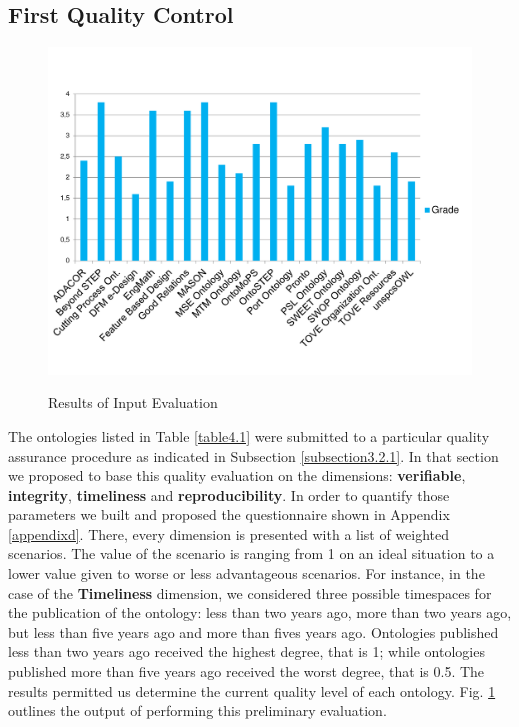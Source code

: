 \subsection{First Quality Control}\label{subsection4.2.2}

\begin{figure}
	\begin{center}
		\includegraphics[scale=0.5]{figure-chapterIV/fig4-1.pdf}\\
		\caption{Results of Input Evaluation}
		\label{figure4-1}
	\end{center}
\end{figure}

The ontologies listed in Table \ref{table4.1} were submitted to a particular quality assurance procedure as indicated in Subsection \ref{subsection3.2.1}. In that section we proposed to base this quality evaluation on the dimensions: \textbf{verifiable}, \textbf{integrity},  \textbf{timeliness} and \textbf{reproducibility}. In order to quantify those parameters we built and proposed the questionnaire   shown in Appendix \ref{appendixd}. There, every dimension is presented with a list of weighted scenarios. The value of the scenario is ranging from 1 on an ideal situation to a lower value given to worse or less advantageous scenarios. For instance, in the case of the \textbf{Timeliness} dimension, we considered three possible timespaces for the publication of the ontology: less than two years ago, more than two years ago, but less than five years ago and more than fives years ago. Ontologies published less than two years ago received the highest degree, that is 1; while ontologies published more than five years ago received the worst degree, that is 0.5. The results permitted us determine the current quality level of each ontology. Fig. \ref{figure4-1} outlines the output of performing this preliminary evaluation. 

